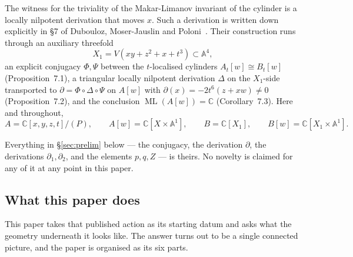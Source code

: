 \documentclass[11pt]{article}
\theoremstyle{definition}
\theoremstyle{remark}
\newcommand{\C}{\mathbb{C}}
\newcommand{\Aff}[1]{\mathbb{A}^{#1}}
\newcommand{\ML}{\operatorname{ML}}
\begin{document}
The witness for the triviality of the Makar-Limanov invariant of the cylinder
is a locally nilpotent derivation that moves $x$. Such a derivation is
written down explicitly in \S7 of Dubouloz, Moser-Jauslin and
Poloni~\cite{DMJP2009}. Their construction runs through an auxiliary
threefold
\begin{equation}\label{eq:X1}
X_1 = V(xy+z^2+x+t^3)\subset\Aff{4},
\end{equation}
an explicit conjugacy $\Phi,\Psi$ between the $t$-localised cylinders
$A_t[w]\cong B_t[w]$ (Proposition~7.1), a triangular locally nilpotent
derivation $\Delta$ on the $X_1$-side transported to $\partial=\Phi\circ
\Delta\circ\Psi$ on $A[w]$ with $\partial(x)=-2t^6(z+xw)\ne 0$
(Proposition~7.2), and the conclusion $\ML(A[w])=\C$ (Corollary~7.3). Here
and throughout,
\begin{equation}\label{eq:rings}
A = \C[x,y,z,t]/(P),\qquad A[w]=\C[X\times\Aff{1}],\qquad
B = \C[X_1],\qquad B[w]=\C[X_1\times\Aff{1}].
\end{equation}

Everything in \S\ref{sec:prelim} below --- the conjugacy, the derivation
$\partial$, the derivations $\partial_1,\partial_2$, and the elements
$p,q,Z$ --- is theirs. No novelty is claimed for any of it at any point in
this paper.

\subsection{What this paper does}

This paper takes that published action as its starting datum and asks what
the geometry underneath it looks like. The answer turns out to be a single
connected picture, and the paper is organised as its six parts.
\end{document}
